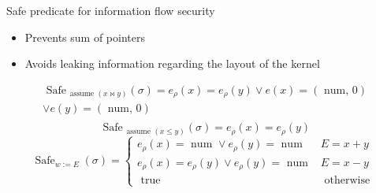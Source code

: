 \documentclass[aspectratio=169]{beamer}
\begin{document}
\begin{frame}{Safe predicate for information flow security}
  \begin{itemize}
    \item Prevents sum of pointers
    \item Avoids leaking information regarding the layout of the kernel
  \end{itemize}

  $$
    \begin{aligned}
      \text { Safe }_{\text {assume }(x \bowtie y)}(\sigma)=e_\rho(x)=e_\rho(y) \vee e(x)=(\text { num, } 0) \\
      \vee e(y)=(\text { num, } 0)                                                                           \\
    \end{aligned}
  $$
  $$
    \text { Safe }_{\text {assume }(x \leq y)}(\sigma)=e_\rho(x)=e_\rho(y)
  $$
  $$
    \operatorname{Safe}_{w:=E}(\sigma)= \begin{cases}e_\rho(x)=\text { num } \vee e_\rho(y)=\text { num } & E=x+y \\ e_\rho(x)=e_\rho(y) \vee e_\rho(y)=\text { num } & E=x-y \\ \text { true } & \text { otherwise }\end{cases}
  $$
\end{frame}
\end{document}
